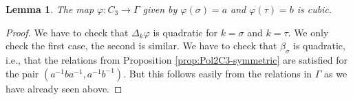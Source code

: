 \documentclass[10pt,a4paper]{amsart}
\newtheorem{lemma}{Lemma}
\begin{document}
\begin{lemma} The map $\varphi:C_3\to \Gamma$ given by $\varphi(\sigma)=a$ and $\varphi(\tau)=b$ is cubic. \end{lemma}

\begin{proof}
We have to check that $\Delta_k\varphi$ is quadratic for $k=\sigma$ and $k=\tau$. We only check the first case, the second is similar. We have to check that $\beta_\sigma$ is quadratic, i.e., that the relations from Proposition \ref{prop:Pol2C3-symmetric} are satisfied for the pair $(a^{-1}ba^{-1},a^{-1}b^{-1})$. But this follows easily from the relations in $\Gamma$ as we have already seen above.
\end{proof}
\end{document}
